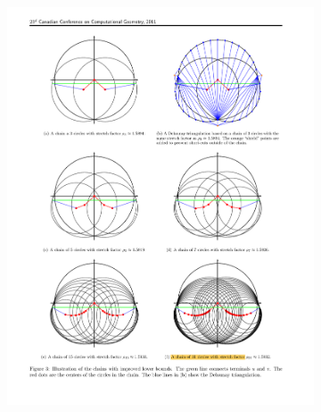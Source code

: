 \begin{figure}[ht]
\hspace*{\fill}
\begin{subfigure}{0.45\textwidth}
\includegraphics[width=\linewidth]{Figures/ZX_3.pdf}
\caption{} \label{fig:ZX_3}
\end{subfigure}
\hspace*{\fill} %
\begin{subfigure}{0.45\textwidth}

\end{subfigure}
\end{figure}
